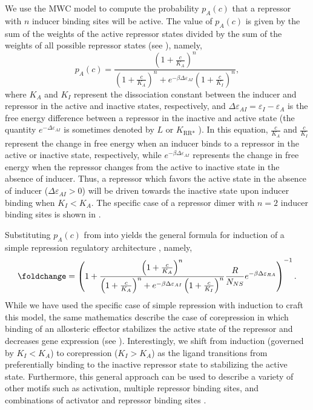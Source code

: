 We use the MWC model to compute the probability $p_A(c)$ that a repressor with $n$ inducer binding
sites will be active. The value of $p_A(c)$ is given by the sum
of the weights of the active repressor states divided by the sum of the weights of all
possible repressor states (see
), namely,
\begin{equation}\label{eq_p_active}
p_A(c)=\frac{\left(1+\frac{c}{K_A}\right)^n}{\left(1+\frac{c}{K_A}\right)^n+e^{-\beta \Delta \varepsilon_{AI} }\left(1+\frac{c}{K_I}\right)^n},
\end{equation}
where $K_A$ and $K_I$ represent the dissociation constant between the inducer
and repressor in the active and inactive states, respectively, and $\Delta
\varepsilon_{AI} = \varepsilon_{I} - \varepsilon_{A}$ is the free energy
difference between a repressor in the inactive and active state (the quantity
$e^{-\Delta \varepsilon_{AI}}$ is sometimes denoted by $L$ \citep{MONOD1965,
Marzen2013} or $K_{\text{RR}*}$ \citep{Daber2011a}). In this equation, $\frac{c}{K_A}$ and $\frac{c}{K_I}$ represent the change in free energy when an inducer binds to a repressor in the active or inactive state, respectively, while $e^{-\beta \Delta \varepsilon_{AI} }$ represents the change in free energy when the repressor changes from the active to inactive state in the absence of inducer. Thus, a repressor which favors
the active state in the absence of inducer ($\Delta \varepsilon_{AI} > 0$) will
be driven towards the inactive state upon inducer binding when $K_I < K_A$. The
specific case of a repressor dimer with $n=2$ inducer binding sites is shown in
.

Substituting $p_A(c)$ from \eref[eq_p_active] into 
yields the general formula for induction of a simple repression regulatory
architecture \citep{Phillips2015a}, namely,
\begin{equation}\label{eq_fold_change_full}
\foldchange = \left(
1+\frac{\left(1+\frac{c}{K_A}\right)^n}{\left(1+\frac{c}{K_A}\right)^n+e^{-\beta \Delta \varepsilon_{AI} }\left(1+\frac{c}{K_I}\right)^n}\frac{R}{N_{NS}}e^{-\beta \Delta\varepsilon_{RA}} \right)^{-1}.
\end{equation}
While we have used the specific case of simple repression with induction to
craft this model, the same mathematics describe the case
of corepression in which binding of an allosteric effector stabilizes the active
state of the repressor and decreases gene expression (see
\fref[figInductionCorepressionPhenotypicProperties]). Interestingly,
we shift from induction (governed by $K_I < K_A$) to corepression ($K_I > K_A$)
as the ligand transitions from preferentially binding to the inactive repressor
state to stabilizing the active state. Furthermore, this general approach can be
used to describe a variety of other motifs such as activation, multiple
repressor binding sites, and combinations of activator and repressor binding
sites \citep{Bintu2005, Brewster2014, Weinert2014}.

